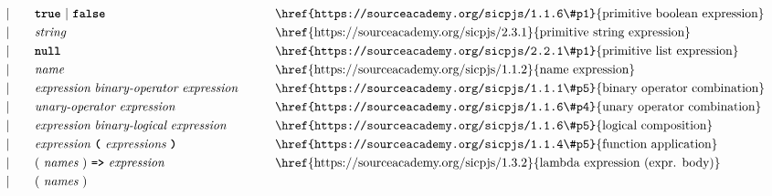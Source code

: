 \begin{alignat*}{9}
&&                       && |   &\quad && \textbf{\texttt{true}}\ |\ \textbf{\texttt{false}}
                                                           && \textrm{\href{https://sourceacademy.org/sicpjs/1.1.6\#p1}{primitive boolean expression}}\\
&&                       && |   &\quad &&  \textit{string}   && \textrm{\href{https://sourceacademy.org/sicpjs/2.3.1}{primitive string expression}}\\
&&                       && |   &\quad && \textbf{\texttt{null}}
                                                           && \textrm{\href{https://sourceacademy.org/sicpjs/2.2.1\#p1}{primitive list expression}} \\
&&                       && |   &\quad &&  \textit{name}   && \textrm{\href{https://sourceacademy.org/sicpjs/1.1.2}{name expression}}\\
&&                       && |   &\quad &&  \textit{expression} \  \textit{binary-operator} \ 
                                            \textit{expression} \qquad
                                                           && \textrm{\href{https://sourceacademy.org/sicpjs/1.1.1\#p5}{binary operator combination}}\\
&&                       && |   &\quad &&   \textit{unary-operator} \ 
                                            \textit{expression}
                                                           && \textrm{\href{https://sourceacademy.org/sicpjs/1.1.6\#p4}{unary operator combination}}\\
&&                       && |   &\quad &&  \textit{expression} \  \textit{binary-logical} \ 
                                            \textit{expression} \qquad
                                                           && \textrm{\href{https://sourceacademy.org/sicpjs/1.1.6\#p5}{logical composition}}\\
&&                       && |   &\quad &&   \textit{expression}\ \textbf{\texttt{(}}\ \textit{expressions}\ \textbf{\texttt{)}}
                                                           && \textrm{\href{https://sourceacademy.org/sicpjs/1.1.4\#p5}{function application}}\\
&&                       && |   &\quad &&   (\ \textit{names}\ )\    
                                            \texttt{\textbf{=>}}\ \textit{expression}
                                                           && \textrm{\href{https://sourceacademy.org/sicpjs/1.3.2}{lambda expression (expr. body)}}\\
&&                       && |   &\quad &&   (\ \textit{names}\ )\    

\end{alignat*}
